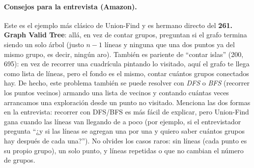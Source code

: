 \paragraph{Consejos para la entrevista (Amazon).} Este es el ejemplo más
clásico de Union-Find y es hermano directo del \textbf{261. Graph Valid Tree}:
allá, en vez de contar grupos, preguntan si el grafo termina siendo un solo
árbol (justo $n-1$ líneas y ninguna que una dos puntos ya del mismo grupo, es
decir, ningún aro). También es pariente de ``contar islas'' (200, 695): en vez
de recorrer una cuadrícula pintando lo visitado, aquí el grafo te llega como
lista de líneas, pero el fondo es el mismo, contar cuántos grupos conectados
hay. De hecho, este problema también se puede resolver con \emph{DFS} o
\emph{BFS} (recorrer los puntos vecinos) armando una lista de vecinos y contando
cuántas veces arrancamos una exploración desde un punto no visitado. Menciona
las dos formas en la entrevista: recorrer con DFS/BFS es más fácil de explicar,
pero Union-Find gana cuando las líneas van llegando de a poco (por ejemplo, si
el entrevistador pregunta ``¿y si las líneas se agregan una por una y quiero
saber cuántos grupos hay después de cada una?''). No olvides los casos raros:
sin líneas (cada punto es su propio grupo), un solo punto, y líneas repetidas o
que no cambian el número de grupos.
